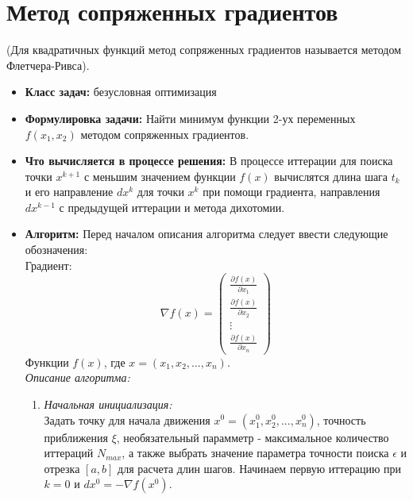 \pagebreak


\section{Метод сопряженных градиентов}

(Для квадратичных функций метод сопряженных градиентов называется методом Флетчера-Ривса).

\begin{itemize}
    \item {\bfseries Класс задач:} безусловная оптимизация
    
    
    \item {\bfseries Формулировка задачи:} Найти минимум функции 2-ух переменных $f(x_1, x_2)$ методом сопряженных градиентов.
    
    
    \item {\bfseries Что вычисляется в процессе решения:}
    В процессе иттерации для поиска точки $x^{k+1}$ с меньшим значением функции $f(x)$ вычислятся длина шага $t_k$ и его направление $dx^k$ для точки $x^k$ при помощи градиента, направления $dx^{k-1}$ с предыдущей иттерации и метода дихотомии.
    
    
    \item {\bfseries Алгоритм:}
    Перед началом описания алгоритма следует ввести следующие обозначения: \\
    
    Градиент:
    \begin{equation*}
    \nabla f(x) = \left(
    \begin{array}{cccc}
        \frac{\partial f(x)}{\partial x_1}\\
        \frac{\partial f(x)}{\partial x_2}\\
        \vdots\\
        \frac{\partial f(x)}{\partial x_n}
    \end{array}
    \right)
    \end{equation*}
    Функции $f(x)$, где $x = (x_1, x_2, ..., x_n)$. \\
    
    {\it Описание алгоритма:}
    \begin{enumerate}
    
        \item {\it Начальная инициализация:}\\
        	Задать точку для начала движения $x^0 = (x^{0}_1, x^{0}_2, ..., x^{0}_n)$, точность приближения $\xi$, необязательный парамметр - максимальное количество иттераций $N_{max}$, а также выбрать значение параметра точности поиска $\epsilon$ и отрезка $[a, b]$ для расчета длин шагов. Начинаем первую иттерацию при $k = 0$ и $dx^0 = -\nabla f(x^0)$.
        

\end{enumerate}
\end{itemize}

